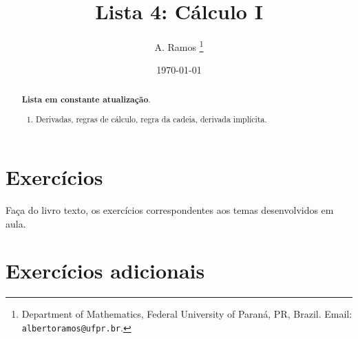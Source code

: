 \documentclass[latin,20pt]{article}
\begin{document}
\title{Lista 4: Cálculo I }
 
\author{
A. Ramos \thanks{Department of Mathematics,
    Federal University of Paraná, PR, Brazil.
    Email: {\tt albertoramos@ufpr.br}.}
}

\date{\today}
 
\maketitle

\begin{abstract}
{\bf Lista em constante atualização}.
 \begin{enumerate}
 \item Derivadas, regras de cálculo, regra da cadeia, derivada implícita. 
 \end{enumerate}
\end{abstract}

 
  \section{Exercícios}   
 
 Faça do livro texto, os exercícios correspondentes aos temas desenvolvidos em aula. 
  
  \section{Exercícios adicionais} 
\end{document}
